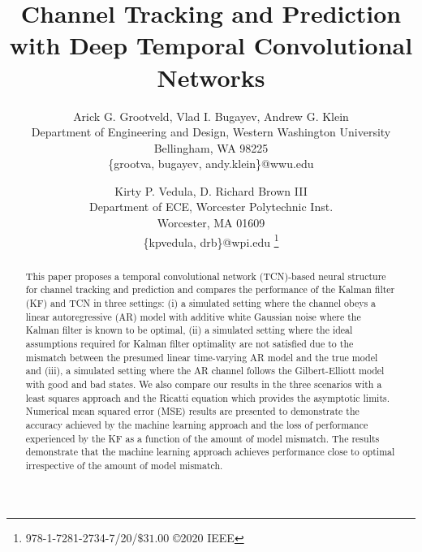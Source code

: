 \documentclass[twocolumn,letterpaper]{IEEEAerospaceCLS}  %
\begin{document}
\title{Channel Tracking and Prediction with Deep Temporal Convolutional Networks}

\author{%
Arick G. Grootveld, Vlad I. Bugayev, Andrew G. Klein\\
Department of Engineering and Design, Western Washington University\\
Bellingham, WA 98225\\
\{grootva, bugayev, andy.klein\}@wwu.edu
\and
Kirty P. Vedula, D. Richard Brown III\\
Department of ECE, Worcester Polytechnic Inst.\\
Worcester, MA 01609\\
\{kpvedula, drb\}@wpi.edu
\thanks{\footnotesize 978-1-7281-2734-7/20/$\$31.00$ \copyright2020 IEEE}              %
}


\maketitle

\thispagestyle{plain}
\pagestyle{plain}




\begin{abstract}

This paper proposes a temporal convolutional network (TCN)-based neural structure for channel tracking and prediction and compares the performance of the Kalman filter (KF) and TCN in three settings: (i) a simulated setting where the channel obeys a linear autoregressive (AR) model with additive white Gaussian noise where the Kalman filter is known to be optimal, (ii) a simulated setting where the ideal assumptions required for Kalman filter optimality are not satisfied due to the mismatch between the presumed linear time-varying AR model and the true model and (iii), a simulated setting where the AR channel follows the Gilbert-Elliott model with good and bad states. We  also  compare  our  results in  the  three  scenarios  with  a  least  squares  approach  and  the Ricatti equation which provides the asymptotic limits. Numerical mean squared error (MSE) results are presented to demonstrate the accuracy achieved by the machine learning approach and the loss of performance experienced by the KF as a function of the amount of model mismatch. The results demonstrate that the machine learning approach achieves performance close to optimal irrespective of the amount of model mismatch.

\end{abstract}
\end{document}
